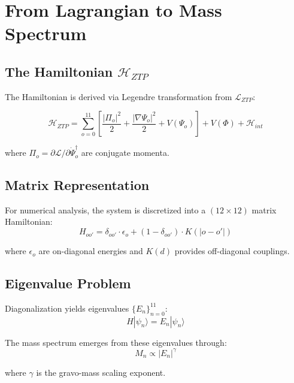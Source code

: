 \documentclass[11pt,a4paper]{book}
\theoremstyle{remark}
\newcommand{\Lagr}{\mathcal{L}}
\newcommand{\Ham}{\mathcal{H}}
\begin{document}
\section{From Lagrangian to Mass Spectrum}

\subsection{The Hamiltonian $\Ham_{ZTP}$}

The Hamiltonian is derived via Legendre transformation from $\Lagr_{ZTP}$:

\begin{equation}
\Ham_{ZTP} = \sum_{o=0}^{11} \left[ \frac{|\Pi_o|^2}{2} + \frac{|\nabla\Psi_o|^2}{2} + V(\Psi_o) \right] + V(\Phi) + \Ham_{int}
\end{equation}

where $\Pi_o = \partial\Lagr/\partial\dot{\Psi}_o^\dagger$ are conjugate momenta.

\subsection{Matrix Representation}

For numerical analysis, the system is discretized into a $(12 \times 12)$ matrix Hamiltonian:
\begin{equation}
H_{oo'} = \delta_{oo'} \cdot \epsilon_o + (1 - \delta_{oo'}) \cdot K(|o - o'|)
\end{equation}

where $\epsilon_o$ are on-diagonal energies and $K(d)$ provides off-diagonal couplings.

\subsection{Eigenvalue Problem}

Diagonalization yields eigenvalues $\{E_n\}_{n=0}^{11}$:
\begin{equation}
H |\psi_n\rangle = E_n |\psi_n\rangle
\end{equation}

The mass spectrum emerges from these eigenvalues through:
\begin{equation}
M_n \propto |E_n|^\gamma
\end{equation}

where $\gamma$ is the gravo-mass scaling exponent.

\newpage
\end{document}
